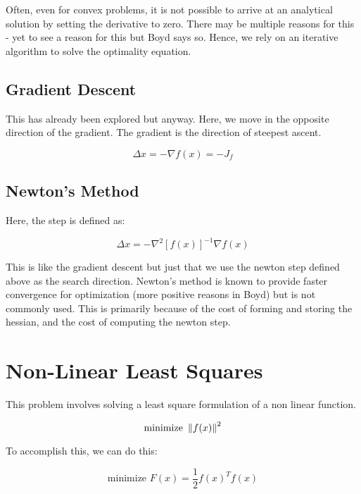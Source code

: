 Often, even for convex problems, it is not possible to arrive at an analytical solution by setting the derivative to zero. There may be multiple reasons for this - yet to see a reason for this but Boyd says so. Hence, we rely on an iterative algorithm to solve the optimality equation.

\subsection{Gradient Descent}

This has already been explored but anyway. Here, we move in the opposite direction of the gradient. The gradient is the direction of steepest ascent. 

\begin{equation}
    \Delta x = -\nabla f(x) = -J_f
\end{equation}

\subsection{Newton's Method}

Here, the step is defined as:

\begin{equation}
    \Delta x = -\nabla^2[f(x)]^{-1}\nabla f(x)
\end{equation}

This is like the gradient descent but just that we use the newton step defined above as the search direction. Newton's method is known to provide faster convergence for optimization (more positive reasons in Boyd) but is not commonly used. This is primarily because of the cost of forming and storing the hessian, and the cost of computing the newton step.

\section{Non-Linear Least Squares}

This problem involves solving a least square formulation of a non linear function.

\begin{equation}
    \text{minimize }\left\lVert f(x)\right\rVert^2
\end{equation}

To accomplish this, we can do this:

\begin{equation}
    \text{minimize }F(x) = \frac{1}{2}f(x)^Tf(x)
\end{equation}

